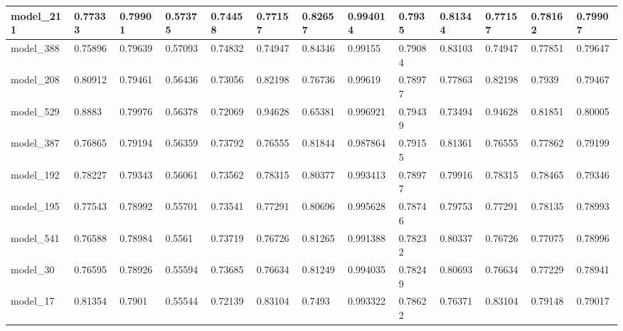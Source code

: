 \begin{tabular}{|l|l|l|l|l|l|l|l|l|l|l|l|l|}
model\_211     & 0.77333     & 0.79901        & 0.57375      & 0.74458          & 0.77157              & 0.82657              & 0.994014     & 0.7935            & 0.81344            & 0.77157         & 0.78162     & 0.79907      \\ \hline
model\_388     & 0.75896     & 0.79639        & 0.57093      & 0.74832          & 0.74947              & 0.84346              & 0.99155      & 0.79084           & 0.83103            & 0.74947         & 0.77851     & 0.79647      \\ \hline
model\_208     & 0.80912     & 0.79461        & 0.56436      & 0.73056          & 0.82198              & 0.76736              & 0.99619      & 0.78977           & 0.77863            & 0.82198         & 0.7939      & 0.79467      \\ \hline
model\_529     & 0.8883      & 0.79976        & 0.56378      & 0.72069          & 0.94628              & 0.65381              & 0.996921     & 0.79439           & 0.73494            & 0.94628         & 0.81851     & 0.80005      \\ \hline
model\_387     & 0.76865     & 0.79194        & 0.56359      & 0.73792          & 0.76555              & 0.81844              & 0.987864     & 0.79155           & 0.81361            & 0.76555         & 0.77862     & 0.79199      \\ \hline
model\_192     & 0.78227     & 0.79343        & 0.56061      & 0.73562          & 0.78315              & 0.80377              & 0.993413     & 0.78977           & 0.79916            & 0.78315         & 0.78465     & 0.79346      \\ \hline
model\_195     & 0.77543     & 0.78992        & 0.55701      & 0.73541          & 0.77291              & 0.80696              & 0.995628     & 0.78746           & 0.79753            & 0.77291         & 0.78135     & 0.78993      \\ \hline
model\_541     & 0.76588     & 0.78984        & 0.5561       & 0.73719          & 0.76726              & 0.81265              & 0.991388     & 0.78232           & 0.80337            & 0.76726         & 0.77075     & 0.78996      \\ \hline
model\_30      & 0.76595     & 0.78926        & 0.55594      & 0.73685          & 0.76634              & 0.81249              & 0.994035     & 0.78249           & 0.80693            & 0.76634         & 0.77229     & 0.78941      \\ \hline
model\_17      & 0.81354     & 0.7901         & 0.55544      & 0.72139          & 0.83104              & 0.7493               & 0.993322     & 0.78622           & 0.76371            & 0.83104         & 0.79148     & 0.79017      \\ \hline

\end{tabular}
